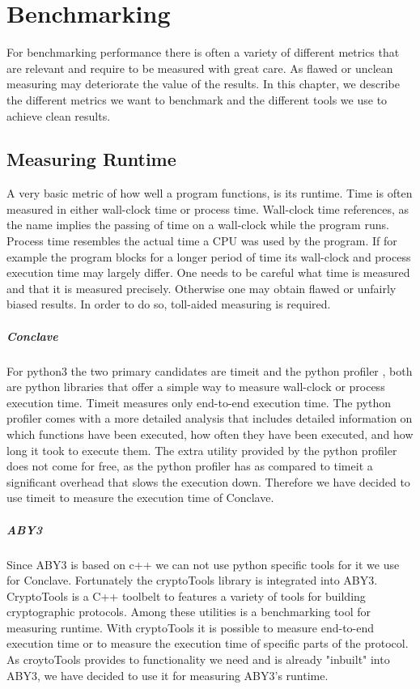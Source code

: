 \chapter{Benchmarking}
For benchmarking performance there is often a variety of different metrics that are relevant and require to be measured with great care. As flawed or unclean measuring may deteriorate the value of the results. In this chapter, we describe the different metrics we want to benchmark and the different tools we use to achieve clean results.

\section{Measuring Runtime}
A very basic metric of how well a program functions, is its runtime. Time is often measured in either wall-clock time or process time. Wall-clock time references, as the name implies the passing of time on a wall-clock while the program runs. 
Process time resembles the actual time a CPU was used by the program. If for example the program blocks for a longer period of time its wall-clock and process execution time may largely differ. One needs to be careful what time is measured and that it is measured precisely. Otherwise one may obtain flawed or unfairly biased results. In order to do so, toll-aided measuring is required.
\paragraph{Conclave}
 For python3 the two primary candidates are timeit \cite{time} and the python profiler \cite{cProfile},
 both are python libraries that offer a simple way to measure wall-clock or process execution time. Timeit measures only end-to-end execution time. The python profiler comes with a more detailed analysis that includes detailed information on which functions have been executed, how often they have been executed, and how long it took to execute them. The extra utility provided by the python profiler does not come for free, as the python profiler has as compared to timeit a significant overhead that slows the execution down. Therefore we have decided to use timeit to measure the execution time of Conclave. 
\paragraph{ABY3}
Since ABY3 is based on c++ we can not use python specific tools for it we use for Conclave. Fortunately the cryptoTools library \cite{cryotoTools} is integrated into ABY3. CryptoTools is a C++ toolbelt to features a variety of tools for building cryptographic protocols. Among these utilities is a benchmarking tool for measuring runtime. With cryptoTools it is possible to measure end-to-end execution time or to measure the execution time of specific parts of the protocol. As croytoTools provides to functionality we need and is already "inbuilt" into ABY3, we have decided to use it for measuring ABY3's runtime.
